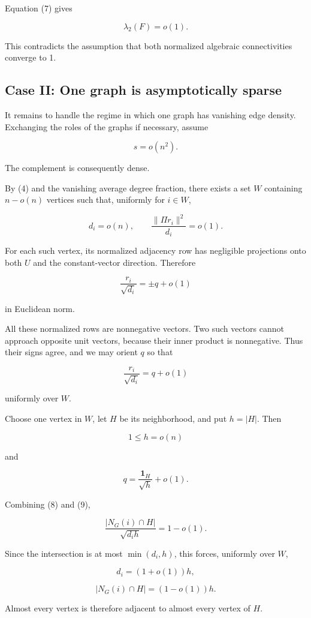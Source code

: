 \documentclass[11pt]{article}
\begin{document}
Equation (7) gives

\[
\lambda_2(F)=o(1).
\]

This contradicts the assumption that both normalized algebraic connectivities converge to 1.

\subsection{Case II: One graph is asymptotically sparse}

It remains to handle the regime in which one graph has vanishing edge density. Exchanging the roles of the graphs if necessary, assume

\[
s=o(n^2).
\]

The complement is consequently dense.

By (4) and the vanishing average degree fraction, there exists a set \(W\) containing \(n-o(n)\) vertices such that, uniformly for \(i\in W\),

\[
d_i=o(n),
\qquad
\frac{\|\Pi r_i\|^2}{d_i}=o(1).
\]

For each such vertex, its normalized adjacency row has negligible projections onto both \(U\) and the constant-vector direction. Therefore

\[
\frac{r_i}{\sqrt{d_i}}
=\pm q+o(1)
\]

in Euclidean norm.

All these normalized rows are nonnegative vectors. Two such vectors cannot approach opposite unit vectors, because their inner product is nonnegative. Thus their signs agree, and we may orient \(q\) so that

\[
\frac{r_i}{\sqrt{d_i}}
=q+o(1)
\tag{8}
\]

uniformly over \(W\).

Choose one vertex in \(W\), let \(H\) be its neighborhood, and put \(h=|H|\). Then

\[
1\leq h=o(n)
\]

and

\[
q=\frac{\mathbf1_H}{\sqrt h}+o(1).
\tag{9}
\]

Combining (8) and (9),

\[
\frac{|N_G(i)\cap H|}{\sqrt{d_i h}}
=1-o(1).
\]

Since the intersection is at most \(\min(d_i,h)\), this forces, uniformly over \(W\),

\[
d_i=(1+o(1))h,
\]

\[
|N_G(i)\cap H|=(1-o(1))h.
\]

Almost every vertex is therefore adjacent to almost every vertex of \(H\).
\end{document}
